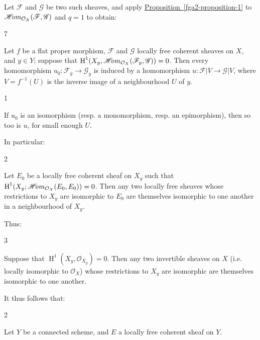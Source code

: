   Let \(\mathscr {F}\) and \(\mathscr {G}\) be two such sheaves, and apply \hyperref[fga2-proposition-1]{Proposition~\ref*{fga2-proposition-1}} to \(\mathscr {H}\kern  -2.5pt\mathit {om}_{\mathcal {O}_X}(\mathscr {F},\mathscr {G})\) and \(q=1\) to obtain:\begin{theorem}{7}\label{fga2-theorem-7}\skipsinglepar\par{}Let \(f\) be a flat proper morphism, \(\mathscr {F}\) and \(\mathscr {G}\) locally free coherent sheaves on \(X\), and \(y\in  Y\);
    suppose that \(\operatorname {H}^1(X_y,\mathscr {H}\kern  -2.5pt\mathit {om}_{\mathcal {O}_X}(\mathscr {F}_y,\mathscr {G}))=0\).
    Then every homomorphism \(u_0\colon \mathscr {F}_y\to \mathscr {G}_y\) is induced by a homomorphism \(u\colon \mathscr {F}|V\to \mathscr {G}|V\), where \(V=f^{-1}(U)\) is the inverse image of a neighbourhood \(U\) of \(y\).\end{theorem}\begin{corollary}{1}\label{fga2-theorem-7-corollary-1}\skipsinglepar\par{}If \(u_0\) is an isomorphism (resp. a monomorphism, resp. an epimorphism), then so too is \(u\), for small enough \(U\).\end{corollary}\par{}In particular:\begin{corollary}{2}\label{fga2-theorem-7-corollary-2}\skipsinglepar\par{}Let \(E_0\) be a locally free coherent sheaf on \(X_y\) such that \(\operatorname {H}^1(X_y;\mathscr {H}\kern  -2.5pt\mathit {om}_{\mathcal {O}_X}(E_0,E_0))=0\).
    Then any two locally free sheaves whose restrictions to \(X_y\) are isomorphic to \(E_0\) are themselves isomorphic to one another in a neighbourhood of \(X_y\).\end{corollary}\par{}Thus:\begin{corollary}{3}\label{fga2-theorem-7-corollary-3}\skipsinglepar\par{}Suppose that \(\operatorname {H}^1(X_y,\mathcal {O}_{X_y})=0\).
    Then any two invertible sheaves on \(X\) (i.e. locally isomorphic to \(\mathcal {O}_X\)) whose restrictions to \(X_y\) are isomorphic are themselves isomorphic to one another.\end{corollary}\par{}It thus follows that:\begin{proposition}{2}\label{fga2-proposition-2}\skipsinglepar\par{}Let \(Y\) be a connected scheme, and \(E\) a locally free coherent sheaf on \(Y\).

\end{proposition}
